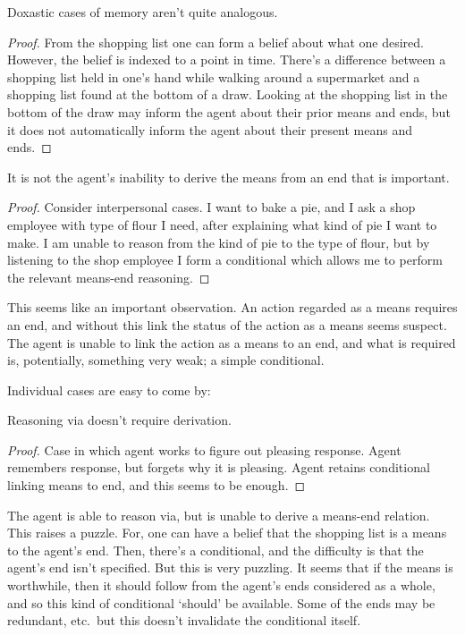 \documentclass[10pt]{article}
\begin{document}
\begin{proposition}
  Doxastic cases of memory aren't quite analogous.
  \begin{proof}
    From the shopping list one can form a belief about what one desired.
    However, the belief is indexed to a point in time.
    There's a difference between a shopping list held in one's hand while walking around a supermarket and a shopping list found at the bottom of a draw.
    Looking at the shopping list in the bottom of the draw may inform the agent about their prior means and ends, but it does not automatically inform the agent about their present means and ends.
  \end{proof}
\end{proposition}

\begin{proposition}
  It is not the agent's inability to derive the means from an end that is important.
  \begin{proof}
    Consider interpersonal cases.
    I want to bake a pie, and I ask a shop employee with type of flour I need, after explaining what kind of pie I want to make.
    I am unable to reason from the kind of pie to the type of flour, but by listening to the shop employee I form a conditional which allows me to perform the relevant means-end reasoning.
  \end{proof}
\end{proposition}

This seems like an important observation.
An action regarded as a means requires an end, and without this link the status of the action as a means seems suspect.
The agent is unable to link the action as a means to an end, and what is required is, potentially, something very weak; a simple conditional.

Individual cases are easy to come by:

\begin{proposition}
  Reasoning via doesn't require derivation.
  \begin{proof}
    Case in which agent works to figure out pleasing response.
    Agent remembers response, but forgets why it is pleasing.
    Agent retains conditional linking means to end, and this seems to be enough.
  \end{proof}
\end{proposition}

The agent is able to reason via, but is unable to derive a means-end relation.
This raises a puzzle.
For, one can have a belief that the shopping list is a means to the agent's end.
Then, there's a conditional, and the difficulty is that the agent's end isn't specified.
But this is very puzzling.
It seems that if the means is worthwhile, then it should follow from the agent's ends considered as a whole, and so this kind of conditional `should' be available.
Some of the ends may be redundant, etc.\ but this doesn't invalidate the conditional itself.
\end{document}
